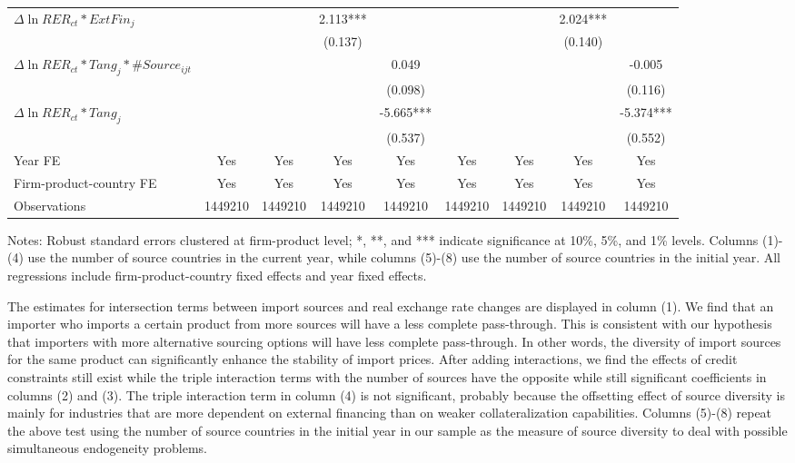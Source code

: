 \begin{table}
{\begin{threeparttable}
\begin{tabular}{lcccccccc}
			$\Delta \ln RER_{ct}*ExtFin_{j}$ &     &       & 2.113*** &       &       &       & 2.024*** &  \\
			&   &       & (0.137) &       &       &       & (0.140) &  \\
			$\Delta \ln RER_{ct}*Tang_{j}*\#Source_{ijt}$ &    &       &       & 0.049 &       &       &       & -0.005 \\
			&    &       &       & (0.098) &       &       &       & (0.116) \\
			$\Delta \ln RER_{ct}*Tang_{j}$ &   &       &       & -5.665*** &       &       &       & -5.374*** \\
			&  &       &       & (0.537) &       &       &       & (0.552) \\
                \midrule
			Year FE  & Yes   & Yes   & Yes   & Yes & Yes   & Yes   & Yes   & Yes\\
			Firm-product-country FE & Yes   & Yes   & Yes   & Yes & Yes   & Yes   & Yes   & Yes\\
			Observations & 1449210 & 1449210 & 1449210 & 1449210 & 1449210 & 1449210 & 1449210 & 1449210\\
			\bottomrule
		\end{tabular}
		\begin{tablenotes}
			\footnotesize
			\item Notes: Robust standard errors clustered at firm-product level; *, **, and *** indicate significance at 10\%, 5\%, and 1\% levels. Columns (1)-(4) use the number of source countries in the current year, while columns (5)-(8) use the number of source countries in the initial year. All regressions include firm-product-country fixed effects and year fixed effects.
		\end{tablenotes}
	\end{threeparttable}
	}
	\label{tab.source}
\end{table}

The estimates for intersection terms between import sources and real exchange rate changes are displayed in column (1). We find that an importer who imports a certain product from more sources will have a less complete pass-through. This is consistent with our hypothesis that importers with more alternative sourcing options will have less complete pass-through. In other words, the diversity of import sources for the same product can significantly enhance the stability of import prices. After adding interactions, we find the effects of credit constraints still exist while the triple interaction terms with the number of sources have the opposite while still significant coefficients in columns (2) and (3). The triple interaction term in column (4) is not significant, probably because the offsetting effect of source diversity is mainly for industries that are more dependent on external financing than on weaker collateralization capabilities. Columns (5)-(8) repeat the above test using the number of source countries in the initial year in our sample as the measure of source diversity to deal with possible simultaneous endogeneity problems. 

